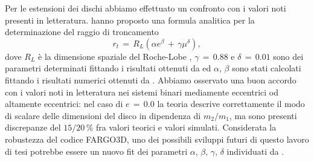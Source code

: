 \documentclass[12pt, a4paper]{report}
\begin{document}
Per le estensioni dei dischi abbiamo effettuato un confronto con i valori noti presenti in letteratura.
\cite{ManaraTronc2019} hanno proposto una formula analitica per la determinazione del raggio di troncamento
\begin{equation}
r_t\,=\,R_{L} (\alpha e^\beta\,+\,\gamma\mu^\delta),
\label{eq:tronc_disc}
\end{equation}
dove $R_L$ è la dimensione spaziale del Roche-Lobe \parencite{Eggleton1983}, $\gamma\,=\,0.88$ e $\delta\,=\,0.01$ sono dei parametri determinati fittando i risultati ottenuti da \cite{PapaloizouPringle1977} ed $\alpha$, $\beta$ sono stati calcolati fittando i risultati numerici ottenuti da \cite{ArtymowiczLubow1994}.
Abbiamo osservato una buon accordo con i valori noti in letteratura nei sistemi binari mediamente eccentrici od altamente eccentrici: nel caso di $e\,=\,0.0$ la teoria descrive correttamente il modo di scalare delle dimensioni del disco in dipendenza di $m_2/m_1$, ma sono presenti discrepanze del $15/20\,\%$ fra valori teorici e valori simulati.
Considerata la robustezza del codice FARGO3D, uno dei possibili sviluppi futuri di questo lavoro di tesi potrebbe essere un nuovo fit dei parametri $\alpha,\,\beta,\,\gamma,\,\delta$ individuati da \cite{ManaraTronc2019}.
\end{document}
